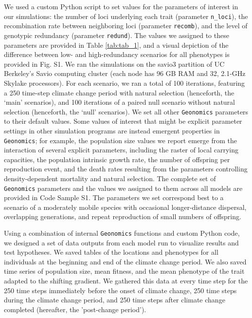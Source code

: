 \documentclass[9pt,twocolumn,twoside,lineno]{new_article}
\begin{document}
We used a custom Python script to set values for the parameters of interest in our simulations: the number of loci underlying
each trait (parameter \texttt{n\_loci}),
the recombination rate between neighboring loci
(parameter \texttt{recomb}),
and the level of genotypic redundancy (parameter \texttt{redund}).
The values we assigned to these parameters are provided in Table \ref{tab:tab_1}, and a visual depiction of the difference between low- and high-redundancy scenarios for all phenotypes is provided in Fig. S1.
We ran the simulations on the 
savio3 partition of UC Berkeley’s Savio computing cluster (each node has 96 GB RAM and 32, 
2.1-GHz Skylake processors). For each scenario, we ran a total of 100 iterations, featuring a 250 time-step climate change period with natural selection (henceforth, 
the ‘main’ scenarios), and 100 iterations of a paired null scenario without natural 
selection (henceforth, the ‘null’ scenarios). We set all other 
\texttt{Geonomics} 
parameters to their default values.
Some values of interest that might be explicit parameter settings in
other simulation programs are instead
emergent properties in \texttt{Geonomics}; for example, the population size values we report emerge from the interaction
of several explicit parameters, including the raster of local carrying capacities,
the population intrinsic growth rate, the number of offspring per reproduction event,
and the death rates resulting from the parameters controlling density-dependent mortality
and natural selection.
The complete set of \texttt{Geonomics} parameters and the values 
we assigned to them across all models are provided in Code Sample S1.
The parameters we set correspond best to a scenario of a moderately mobile species with occasional longer-distance dispersal,
overlapping generations, and repeat reproduction of small numbers of offspring.

Using a combination of internal \texttt{Geonomics} functions and custom Python code, we 
designed a set of data outputs from each model run
to visualize results and test hypotheses.
We saved tables of the locations and phenotypes for all individuals at
the beginning and end of the climate change period. We also saved time 
series of population size, mean fitness, and the mean phenotype of the trait adapted to 
the shifting gradient. We gathered this data at every time step for the 250 time steps immediately 
before the onset of climate change, 250 time steps during the climate change period, and 250 time steps after climate change completed (hereafter, the 'post-change period').
\end{document}

